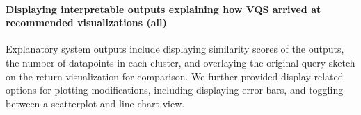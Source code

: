 \paragraph{Displaying interpretable outputs explaining how VQS arrived at recommended visualizations (all)} 
Explanatory system outputs include displaying similarity scores of the outputs, the number of datapoints in each cluster, and overlaying the original query sketch on the return visualization for comparison. We further provided display-related options for plotting modifications, including displaying error bars, and toggling between a scatterplot and line chart view.
